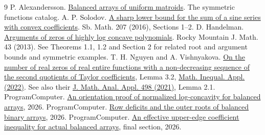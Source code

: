 \documentclass[11pt]{article}
\begin{document}
\begin{thebibliography}{9}
 P. Alexandersson. \href{https://www.symmetricfunctions.com/realRootedOpenProblems.htm\#conjBalancedArrays}{Balanced arrays of uniform matroids}. The symmetric functions catalog.
 A. P. Solodov. \href{https://doi.org/10.1070/SM8633}{A sharp lower bound for the sum of a sine series with convex coefficients}. Sb. Math. 207 (2016), Sections 1--2.
 D. Handelman. \href{https://arxiv.org/abs/1009.6022}{Arguments of zeros of highly log concave polynomials}. Rocky Mountain J. Math. 43 (2013). See Theorems 1.1, 1.2 and Section 2 for related root and argument bounds and symmetric examples.
 T. H. Nguyen and A. Vishnyakova. \href{https://arxiv.org/abs/2101.11757}{On the number of real zeros of real entire functions with a non-decreasing sequence of the second quotients of Taylor coefficients}, Lemma 3.2, \href{https://doi.org/10.7153/mia-2022-25-06}{Math. Inequal. Appl. (2022)}. See also their \href{https://doi.org/10.1016/j.jmaa.2021.124955}{J. Math. Anal. Appl. 498 (2021)}, Lemma 2.1.
 ProgramComputer. \href{https://github.com/ProgramComputer/open-math-research/blob/634a1e212f243289667f917cbb86664d2c81f127/topics/balanced-arrays/orientation-normalization.md}{An orientation proof of normalized log-concavity for balanced arrays}, 2026.
 ProgramComputer. \href{https://github.com/ProgramComputer/open-math-research/pull/173}{Row deficits and the outer roots of balanced binary arrays}, 2026.
 ProgramComputer. \href{https://github.com/ProgramComputer/open-math-research/blob/634a1e212f243289667f917cbb86664d2c81f127/topics/balanced-arrays/effective-upper-curvature/proof.md}{An effective upper-edge coefficient inequality for actual balanced arrays}, final section, 2026.
\end{thebibliography}
\end{document}
